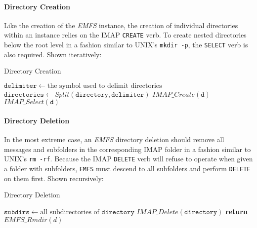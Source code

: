 \documentclass[12pt]{article}
\begin{document}
\paragraph{Directory Creation}

Like the creation of the \textit{EMFS} instance, the creation of individual
directories within an instance relies on the IMAP \texttt{CREATE} verb. To
create nested directories below the root level in a fashion similar to UNIX's
\texttt{mkdir -p}, the \texttt{SELECT} verb is also required. Shown iteratively:

\begin{algorithm}
\caption{Directory Creation}
\begin{algorithmic}[1]
\State $\mathtt{delimiter} \gets \text{the symbol used to delimit directories}$
\State $\mathtt{directories} \gets \mathit{Split}(\mathtt{directory}, \mathtt{delimiter})$
\State $\mathit{IMAP\_Create}(\mathtt{d})$
\EndIf
\State $\mathit{IMAP\_Select}(\mathtt{d})$
\EndFor
\EndProcedure
\end{algorithmic}
\end{algorithm}

\paragraph{Directory Deletion}

In the most extreme case, an \textit{EMFS} directory deletion should remove
all messages and subfolders in the corresponding IMAP folder in a fashion
similar to UNIX's \texttt{rm -rf}. Because the IMAP \texttt{DELETE} verb
will refuse to operate when given a folder with subfolders, \texttt{EMFS} must
descend to all subfolders and perform \texttt{DELETE} on them first. Shown
recursively:

\begin{algorithm}
\caption{Directory Deletion}
\begin{algorithmic}[1]
\State $\mathtt{subdirs} \gets \text{all subdirectories of } \mathtt{directory}$
\State $\mathit{IMAP\_Delete}(\texttt{directory})$
\State \textbf{return}
\Else
{}
\State $\mathit{EMFS\_Rmdir}(\textit{d})$
\EndFor
\EndIf
\EndProcedure
\end{algorithmic}
\end{algorithm}
\end{document}
